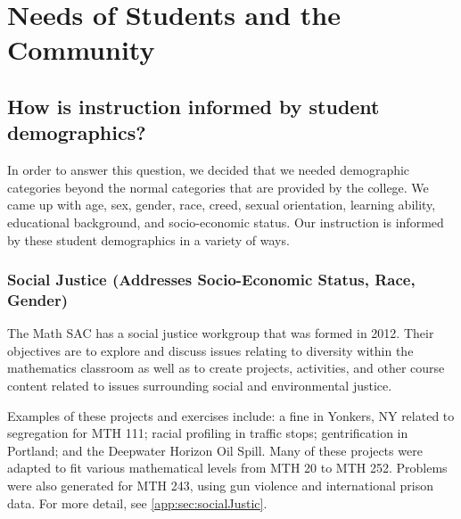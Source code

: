 \chapter{Needs of Students and the Community}
\section{How is instruction informed by student demographics?}
In order to answer this question, we decided that we needed demographic
categories beyond the normal categories that are provided by the college. We
came up with age, sex, gender, race, creed, sexual orientation, learning
ability, educational background, and socio-economic status. Our instruction is
informed by these student demographics in a variety of ways.
\label{needs:sec:definitiondiversity}



\subsection{Social Justice (Addresses Socio-Economic Status, Race, Gender)}
The Math SAC has a social justice workgroup that was formed in 2012.  Their
objectives are to explore and discuss issues relating to diversity within the
mathematics classroom as well as to create projects, activities, and other
course content related to issues surrounding social and environmental justice.

Examples of these projects and exercises include: a fine in Yonkers, NY related
to segregation for MTH 111; racial profiling in traffic stops; gentrification
in Portland; and the Deepwater Horizon Oil Spill. Many of these projects were
adapted to fit various mathematical levels from MTH 20 to MTH 252. Problems
were also generated for MTH 243, using gun violence and international prison
data. For more detail, see \vref{app:sec:socialJustic}.

